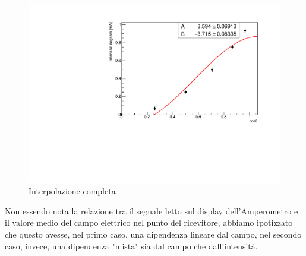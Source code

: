 \begin{figure}[h!]
    \centering
    \includegraphics[scale=.5]{Immagini/coseni quadri.pdf}
    \caption{Interpolazione completa}
    \label{polatizzazione fit}
\end{figure}
Non essendo nota la relazione tra il segnale letto sul display dell'Amperometro e il valore medio del campo elettrico nel punto del ricevitore, abbiamo ipotizzato che questo avesse, nel primo caso, una dipendenza lineare dal campo, nel secondo caso, invece, una dipendenza "mista" sia dal campo che dall'intensità.
